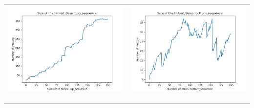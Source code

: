 \documentclass[10pt]{article}
\begin{document}
\begin{tabular}{c|c}
\begin{minipage}{.4\textwidth}
\includegraphics[width=\textwidth]{"DATA/5d/5 generators 2 bound E/top_sequence SIZE"}
\end{minipage} &
\begin{minipage}{.4\textwidth}
\includegraphics[width=\textwidth]{"DATA/5d/5 generators 2 bound E bottomup/bottom_sequence SIZE"}
\end{minipage} \\ \\
\hline \\\begin{minipage}{.4\textwidth}

\end{minipage}
\end{tabular}
\end{document}
